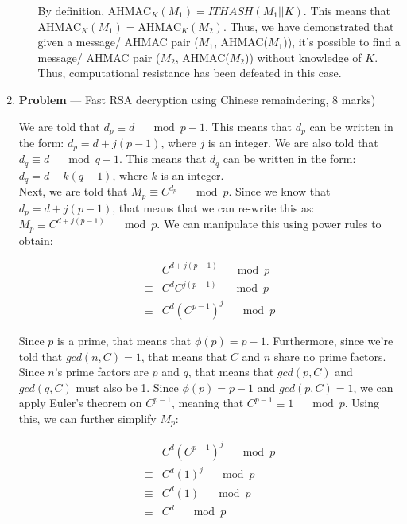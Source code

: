 \documentclass[11pt]{article}
\theoremstyle{definition}
\newcounter{problem}
\newcommand{\AHMAC}{\mathrm{AHMAC}}
\begin{document}
\begin{enumerate}
\begin{enumerate}
By definition, $\AHMAC_K{(M_1)} = ITHASH(M_1 || K)$. This means that $\AHMAC_K{(M_1)} = \AHMAC_K{(M_2)}$. Thus, we have demonstrated that given a message/ AHMAC pair ($M_1$, AHMAC($M_1$)), it's possible to find a message/ AHMAC pair ($M_2$, AHMAC($M_2$)) without knowledge of $K$. Thus, computational resistance has been defeated in this case.

\end{enumerate}

\newpage

\item[] \textbf{Problem \theproblem} --- Fast RSA decryption using Chinese remaindering, 8
    marks)

We are told that $d_p \equiv d \quad \mod{p - 1}$. This means that $d_p$ can be written in the form: $d_p = d + j(p-1)$, where $j$ is an integer. We are also told that $d_q \equiv d \quad \mod{q - 1}$. This means that $d_q$ can be written in the form: $d_q = d + k(q-1)$, where $k$ is an integer. \\ 

Next, we are told that $M_p \equiv C^{d_p} \quad \mod{p}$. Since we know that $d_p = d + j(p-1)$, that means that we can re-write this as: $M_p \equiv C^{d + j(p-1)} \quad \mod{p}$. We can manipulate this using power rules to obtain:

\begin{align*}
    &C^{d + j(p-1)} \quad \mod{p} \\
    \equiv &C^d C^{j(p-1)} \quad \mod{p} \\
    \equiv &C^d (C^{p-1})^j \quad \mod{p}
\end{align*}

Since $p$ is a prime, that means that $\phi{(p)} = p - 1$. Furthermore, since we're told that $gcd(n, C) = 1$, that means that $C$ and $n$ share no prime factors. Since $n$'s prime factors are $p$ and $q$, that means that $gcd(p, C)$ and $gcd(q, C)$ must also be 1. Since $\phi{(p)} = p - 1$ and $gcd(p, C) = 1$, we can apply Euler's theorem on $C^{p - 1}$, meaning that $C^{p - 1} \equiv 1 \quad \mod{p}$. Using this, we can further simplify $M_p$:

\begin{align*}
    &C^d (C^{p-1})^j \quad \mod{p} \\
    \equiv &C^d (1)^j \quad \mod{p} \\
    \equiv &C^d (1) \quad \mod{p} \\
    \equiv &C^d \quad \mod{p}
\end{align*}


\end{enumerate}
\end{document}
